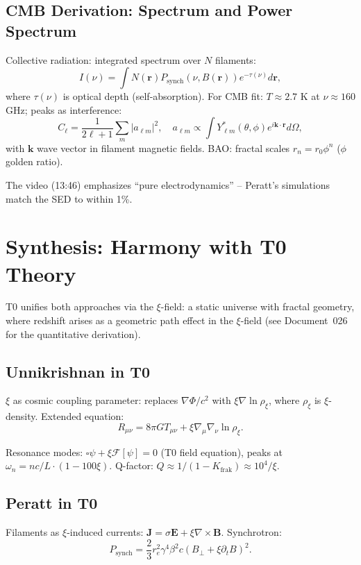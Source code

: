 	\subsection{CMB Derivation: Spectrum and Power Spectrum}
	Collective radiation: integrated spectrum over $N$ filaments:
	\begin{equation}
		I(\nu) = \int N(\mathbf{r}) P_{\text{synch}}(\nu, B(\mathbf{r})) e^{-\tau(\nu)} d\mathbf{r},
	\end{equation}
	where $\tau(\nu)$ is optical depth (self-absorption). For CMB fit: $T \approx 2.7$ K at $\nu \approx 160$ GHz; peaks as interference:
	\begin{equation}
		C_\ell = \frac{1}{2\ell + 1} \sum_m |a_{\ell m}|^2, \quad a_{\ell m} \propto \int Y_{\ell m}^*(\theta, \phi) e^{i \mathbf{k} \cdot \mathbf{r}} d\Omega,
	\end{equation}
	with $\mathbf{k}$ wave vector in filament magnetic fields. BAO: fractal scales $r_n = r_0 \phi^n$ ($\phi$ golden ratio).
	
	The video (13:46) emphasizes ``pure electrodynamics'' -- Peratt's simulations match the SED to within 1\%.
	
	\section{Synthesis: Harmony with T0 Theory}
	T0 unifies both approaches via the $\xi$-field: a static universe with fractal geometry, where redshift arises as a geometric path effect in the $\xi$-field (see Document~026 for the quantitative derivation).
	
	\subsection{Unnikrishnan in T0}
	$\xi$ as cosmic coupling parameter: replaces $\nabla \Phi / c^2$ with $\xi \nabla \ln \rho_\xi$, where $\rho_\xi$ is $\xi$-density. Extended equation:
	\begin{equation}
		R_{\mu\nu} = 8\pi G T_{\mu\nu} + \xi \nabla_\mu \nabla_\nu \ln \rho_\xi.
	\end{equation}
	
	Resonance modes: $\square \psi + \xi \mathcal{F}[\psi] = 0$ (T0 field equation), peaks at $\omega_n = n c / L \cdot (1 - 100 \xi)$. Q-factor: $Q \approx 1 / (1 - K_{\text{frak}}) \approx 10^4 / \xi$.
	
	\subsection{Peratt in T0}
	Filaments as $\xi$-induced currents: $\mathbf{J} = \sigma \mathbf{E} + \xi \nabla \times \mathbf{B}$. Synchrotron:
	\begin{equation}
		P_{\text{synch}} = \frac{2}{3} r_e^2 \gamma^4 \beta^2 c (B_\perp + \xi \partial_t B)^2.
	\end{equation}
	
